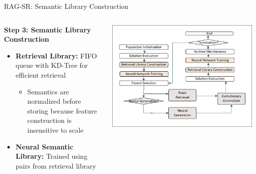 \documentclass[aspectratio=1610]{beamer}
\begin{document}
    \begin{frame}{RAG-SR: Semantic Library Construction}
        \begin{columns}
            \begin{column}{0.5\textwidth}
                \textbf{Step 3: Semantic Library Construction}
                \begin{itemize}
                    \item \textbf{Retrieval Library:} FIFO queue with KD-Tree for efficient retrieval
                    \begin{itemize}
                        \item Semantics are normalized before storing because feature construction is insensitive to scale
                    \end{itemize}
                    \item \textbf{Neural Semantic Library:} Trained using pairs from retrieval library
                \end{itemize}
            \end{column}
            \begin{column}{0.5\textwidth}
                \includegraphics[width=1.0\textwidth]{figs/Workflow.pdf}
            \end{column}
        \end{columns}
    \end{frame}
\end{document}
